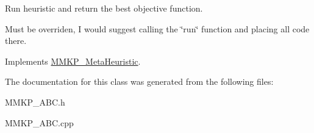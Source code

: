 Run heuristic and return the best objective function. 

Must be overriden, I would suggest calling the \char`\"{}run\char`\"{} function and placing all code there. 

Implements \hyperlink{class_m_m_k_p___meta_heuristic_acc3de42187c16d4a31776e18135035e5}{M\+M\+K\+P\+\_\+\+Meta\+Heuristic}.



The documentation for this class was generated from the following files\+:\begin{DoxyCompactItemize}
\item 
M\+M\+K\+P\+\_\+\+A\+B\+C.\+h\item 
M\+M\+K\+P\+\_\+\+A\+B\+C.\+cpp\end{DoxyCompactItemize}
